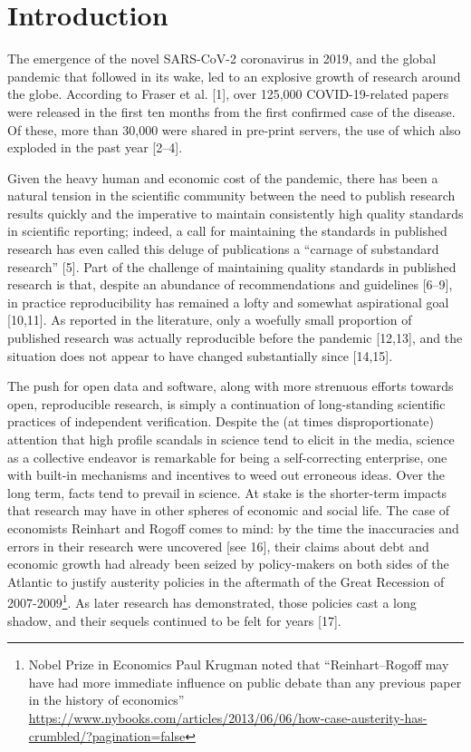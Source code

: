\documentclass[10pt,letterpaper]{article}
\begin{document}
\linenumbers

\hypertarget{introduction}{%
\section{Introduction}\label{introduction}}

The emergence of the novel SARS-CoV-2 coronavirus in 2019, and the
global pandemic that followed in its wake, led to an explosive growth of
research around the globe. According to Fraser et al. {[}1{]}, over
125,000 COVID-19-related papers were released in the first ten months
from the first confirmed case of the disease. Of these, more than 30,000
were shared in pre-print servers, the use of which also exploded in the
past year {[}2--4{]}.

Given the heavy human and economic cost of the pandemic, there has been
a natural tension in the scientific community between the need to
publish research results quickly and the imperative to maintain
consistently high quality standards in scientific reporting; indeed, a
call for maintaining the standards in published research has even called
this deluge of publications a ``carnage of substandard research''
{[}5{]}. Part of the challenge of maintaining quality standards in
published research is that, despite an abundance of recommendations and
guidelines {[}6--9{]}, in practice reproducibility has remained a lofty
and somewhat aspirational goal {[}10,11{]}. As reported in the
literature, only a woefully small proportion of published research was
actually reproducible before the pandemic {[}12,13{]}, and the situation
does not appear to have changed substantially since {[}14,15{]}.

The push for open data and software, along with more strenuous efforts
towards open, reproducible research, is simply a continuation of
long-standing scientific practices of independent verification. Despite
the (at times disproportionate) attention that high profile scandals in
science tend to elicit in the media, science as a collective endeavor is
remarkable for being a self-correcting enterprise, one with built-in
mechanisms and incentives to weed out erroneous ideas. Over the long
term, facts tend to prevail in science. At stake is the shorter-term
impacts that research may have in other spheres of economic and social
life. The case of economists Reinhart and Rogoff comes to mind: by the
time the inaccuracies and errors in their research were uncovered {[}see
16{]}, their claims about debt and economic growth had already been
seized by policy-makers on both sides of the Atlantic to justify
austerity policies in the aftermath of the Great Recession of
2007-2009\footnote{Nobel Prize in Economics Paul Krugman noted that
  ``Reinhart--Rogoff may have had more immediate influence on public
  debate than any previous paper in the history of economics''
  \url{https://www.nybooks.com/articles/2013/06/06/how-case-austerity-has-crumbled/?pagination=false}}.
As later research has demonstrated, those policies cast a long shadow,
and their sequels continued to be felt for years {[}17{]}.
\end{document}
